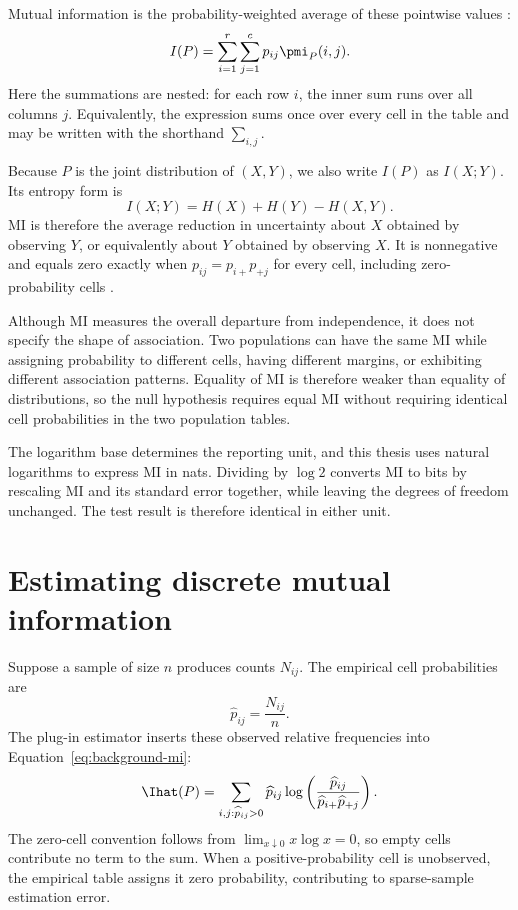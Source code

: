 Mutual information is the probability-weighted average of these pointwise
values \citep{shannon1948,bossomaier2016}:
\begin{equation}
  I(P)
  =\sum_{i=1}^{r}\sum_{j=1}^{c}p_{ij}\pmi_P(i,j).
  \label{eq:background-mi}
\end{equation}
Here the summations are nested: for each row \(i\), the inner sum runs over
all columns \(j\). Equivalently, the expression sums once over every cell in
the table and may be written with the shorthand \(\sum_{i,j}\).

Because \(P\) is the joint distribution of \((X,Y)\), we also write
\(I(P)\) as \(I(X;Y)\). Its entropy form is
\begin{equation}
  I(X;Y)=H(X)+H(Y)-H(X,Y).
  \label{eq:mi-entropy-form}
\end{equation}
MI is therefore the average reduction in uncertainty about \(X\) obtained
by observing \(Y\), or equivalently about \(Y\) obtained by observing \(X\).
It is nonnegative and equals zero exactly when
\(p_{ij}=p_{i+}p_{+j}\) for every cell, including zero-probability cells
\citep{bossomaier2016}.

Although MI measures the overall departure from independence, it does not
specify the shape of association. Two populations can have the same MI while assigning
probability to different cells, having different margins, or exhibiting
different association patterns. Equality of MI is therefore weaker than equality of distributions, so
the null hypothesis requires equal MI without requiring identical cell
probabilities in the two population tables.

The logarithm base determines the reporting unit, and this thesis uses
natural logarithms to express MI in nats. Dividing by \(\log 2\)
converts MI to bits by rescaling MI and its standard error together,
while leaving the degrees of freedom unchanged. The test result is
therefore identical in either unit.

\section{Estimating discrete mutual information}
\label{sec:background-mi-bias}

Suppose a sample of size \(n\) produces counts \(N_{ij}\). The empirical cell
probabilities are
\begin{equation}
  \widehat p_{ij}=\frac{N_{ij}}{n}.
\end{equation}
The plug-in estimator inserts these observed relative frequencies into
Equation~\eqref{eq:background-mi}:
\begin{equation}
  \Ihat(P)
  =\sum_{i,j:\widehat p_{ij}>0}
  \widehat p_{ij}
  \log\left(
  \frac{\widehat p_{ij}}
       {\widehat p_{i+}\widehat p_{+j}}
  \right).
  \label{eq:plugin-mi-background}
\end{equation}
The zero-cell convention follows from
\(\lim_{x\downarrow0}x\log x=0\), so empty cells contribute no term to
the sum. When a positive-probability cell is unobserved, the empirical
table assigns it zero probability, contributing to sparse-sample estimation
error.

